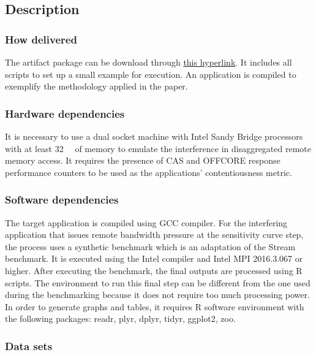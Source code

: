 \documentclass{sigplanconf}
\begin{document}
	\subsection{Description}
	
	\subsubsection{How delivered} 
	
	The artifact package can be download through \href{https://zenodo.org/record/3749250/files/artifact.tar.gz?download=1}{this hyperlink}. It includes all
	scripts to set up a small example for execution. An application is compiled to exemplify
	the methodology applied in the paper. 
	
	\subsubsection{Hardware dependencies} 
	
	It is necessary to use a dual socket machine with Intel Sandy Bridge processors with at
	least \SI{32}{\giga\byte} of memory to emulate the interference in disaggregated remote
	memory access. It requires the presence of CAS and OFFCORE response performance
	counters to be used as the applications' contentiousness metric.  
	
	\subsubsection{Software dependencies} 
	
	The target application is compiled using GCC compiler. For the interfering application
	that issues remote bandwidth pressure at the sensitivity curve step, the process uses a
	synthetic benchmark which is an adaptation of the Stream benchmark. It is executed using
	the Intel compiler and Intel MPI 2016.3.067 or higher. After executing the benchmark, the final outputs are processed using R scripts. The
	environment to run this final step can be different from the one used during the
	benchmarking because it does not require too much processing power. In order to generate
	graphs and tables, it requires R software environment with the following packages: readr,
	plyr, dplyr, tidyr, ggplot2, zoo. 
	
	
	\subsubsection{Data sets}
	
\end{document}
